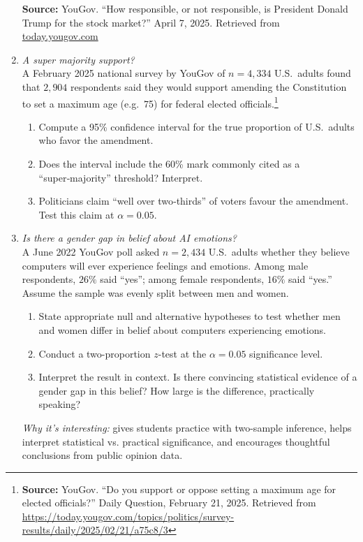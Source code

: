 \documentclass[11pt]{article}
\begin{document}
\begin{enumerate}[label=\textbf{Q\,\arabic*:}, left=0pt]
      \vspace{0.5em}
      \noindent\textbf{Source:} YouGov. “How responsible, or not responsible, is President Donald Trump for the stock market?” April 7, 2025. Retrieved from \href{https://today.yougov.com/topics/politics/survey-results/daily/2025/04/07/6be5c/3}{today.yougov.com}
\item \emph{A super majority support?} \\ A February 2025 national survey by YouGov of $n=4{,}334$ U.S.\ adults found that $2{,}904$ respondents 
      said they would support amending the Constitution to set a maximum age (e.g.\ 75) for federal elected officials.\footnote{\textbf{Source:} YouGov. “Do you support or oppose setting a maximum age for elected officials?” Daily Question, February 21, 2025. Retrieved from \url{https://today.yougov.com/topics/politics/survey-results/daily/2025/02/21/a75c8/3}}
      \begin{enumerate}[label=(\alph*)]
         \item Compute a 95\% confidence interval for the true proportion of U.S.\ adults who favor the amendment.  
         \item Does the interval include the 60\% mark commonly cited as a “super‑majority” threshold?  Interpret.  
         \item Politicians claim “well over two‑thirds” of voters favour the amendment.  Test this claim at $\alpha=0.05$.
      \end{enumerate}
      
\item \emph{Is there a gender gap in belief about AI emotions?} \\
      A June 2022 YouGov poll asked $n = 2{,}434$ U.S.\ adults whether they believe computers will ever experience feelings and emotions. Among male respondents, $26\%$ said “yes”; among female respondents, $16\%$ said “yes.” Assume the sample was evenly split between men and women.

      \begin{enumerate}[label=(\alph*)]
         \item State appropriate null and alternative hypotheses to test whether men and women differ in belief about computers experiencing emotions.
         \item Conduct a two-proportion $z$-test at the $\alpha = 0.05$ significance level.
         \item Interpret the result in context. Is there convincing statistical evidence of a gender gap in this belief? How large is the difference, practically speaking?
      \end{enumerate}
      \textit{Why it’s interesting:} gives students practice with two-sample inference, helps interpret statistical vs. practical significance, and encourages thoughtful conclusions from public opinion data.


\end{enumerate}
\end{document}
